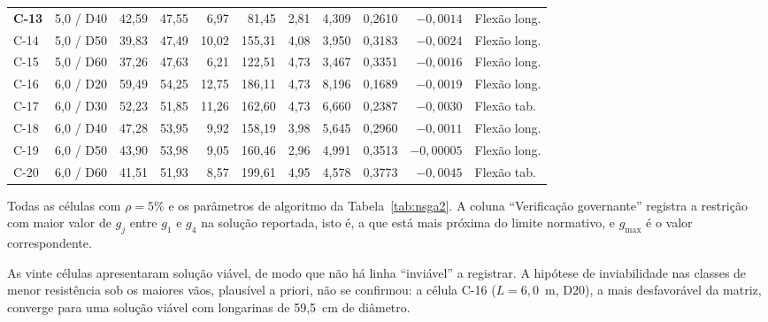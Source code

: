 \begin{table}[!ht]
\begin{threeparttable}
\begin{tabular*}{\textwidth}{@{\extracolsep{\fill}}llrrrrrrrrl@{\extracolsep{\fill}}}
\textbf{C-13} & 5{,}0 / D40 & 42{,}59 & 47{,}55 & 6{,}97 & 81{,}45 & 2{,}81 & 4{,}309 & 0{,}2610 & $-0{,}0014$ & Flexão long. \\
C-14 & 5{,}0 / D50 & 39{,}83 & 47{,}49 & 10{,}02 & 155{,}31 & 4{,}08 & 3{,}950 & 0{,}3183 & $-0{,}0024$ & Flexão long. \\
C-15 & 5{,}0 / D60 & 37{,}26 & 47{,}63 & 6{,}21 & 122{,}51 & 4{,}73 & 3{,}467 & 0{,}3351 & $-0{,}0016$ & Flexão long. \\
\midrule
C-16 & 6{,}0 / D20 & 59{,}49 & 54{,}25 & 12{,}75 & 186{,}11 & 4{,}73 & 8{,}196 & 0{,}1689 & $-0{,}0019$ & Flexão long. \\
C-17 & 6{,}0 / D30 & 52{,}23 & 51{,}85 & 11{,}26 & 162{,}60 & 4{,}73 & 6{,}660 & 0{,}2387 & $-0{,}0030$ & Flexão tab. \\
C-18 & 6{,}0 / D40 & 47{,}28 & 53{,}95 & 9{,}92 & 158{,}19 & 3{,}98 & 5{,}645 & 0{,}2960 & $-0{,}0011$ & Flexão long. \\
C-19 & 6{,}0 / D50 & 43{,}90 & 53{,}98 & 9{,}05 & 160{,}46 & 2{,}96 & 4{,}991 & 0{,}3513 & $-0{,}00005$ & Flexão long. \\
C-20 & 6{,}0 / D60 & 41{,}51 & 51{,}93 & 8{,}57 & 199{,}61 & 4{,}95 & 4{,}578 & 0{,}3773 & $-0{,}0045$ & Flexão tab. \\
\bottomrule
\end{tabular*}
\begin{tablenotes}
\footnotesize
\item Todas as células com $\rho = 5\%$ e os parâmetros de algoritmo da Tabela~\ref{tab:nsga2}.
A coluna ``Verificação governante'' registra a restrição com maior valor de $g_j$ entre $g_1$ e $g_4$ na solução reportada, isto é, a que está mais próxima do limite normativo, e $g_{\max}$ é o valor correspondente.
\item As vinte células apresentaram solução viável, de modo que não há linha ``inviável'' a registrar.
A hipótese de inviabilidade nas classes de menor resistência sob os maiores vãos, plausível a priori, não se confirmou: a célula C-16 ($L = 6{,}0$~m, D20), a mais desfavorável da matriz, converge para uma solução viável com longarinas de 59{,}5~cm de diâmetro.
\end{tablenotes}
\end{threeparttable}
\end{table}

